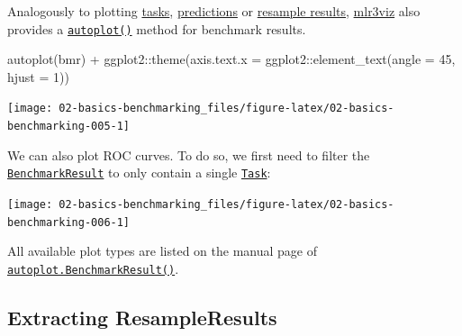 \documentclass[
]{scrbook}
\newenvironment{Shaded}{\begin{snugshade}}{\end{snugshade}}
\newcommand{\AttributeTok}[1]{\textcolor[rgb]{0.77,0.63,0.00}{#1}}
\newcommand{\DecValTok}[1]{\textcolor[rgb]{0.00,0.00,0.81}{#1}}
\newcommand{\FunctionTok}[1]{\textcolor[rgb]{0.00,0.00,0.00}{#1}}
\newcommand{\NormalTok}[1]{#1}
\newcommand{\OtherTok}[1]{\textcolor[rgb]{0.56,0.35,0.01}{#1}}
\newcommand{\SpecialCharTok}[1]{\textcolor[rgb]{0.00,0.00,0.00}{#1}}
\newcommand{\StringTok}[1]{\textcolor[rgb]{0.31,0.60,0.02}{#1}}
\renewenvironment{Shaded} {\begin{snugshade}\small} {\end{snugshade}}
\begin{document}
Analogously to plotting \protect\hyperlink{autoplot-task}{tasks}, \protect\hyperlink{autoplot-prediction}{predictions} or \protect\hyperlink{autoplot-resampleresult}{resample results}, \href{https://mlr3viz.mlr-org.com}{mlr3viz} also provides a \href{https://www.rdocumentation.org/packages/ggplot2/topics/autoplot}{\texttt{autoplot()}} method for benchmark results.

\begin{Shaded}
\begin{Highlighting}[]
\FunctionTok{autoplot}\NormalTok{(bmr) }\SpecialCharTok{+}\NormalTok{ ggplot2}\SpecialCharTok{::}\FunctionTok{theme}\NormalTok{(}\AttributeTok{axis.text.x =}\NormalTok{ ggplot2}\SpecialCharTok{::}\FunctionTok{element\_text}\NormalTok{(}\AttributeTok{angle =} \DecValTok{45}\NormalTok{, }\AttributeTok{hjust =} \DecValTok{1}\NormalTok{))}
\end{Highlighting}
\end{Shaded}

\begin{center}\texttt{[image: 02-basics-benchmarking\_files/figure-latex/02-basics-benchmarking-005-1]} \end{center}

We can also plot ROC curves.
To do so, we first need to filter the \href{https://mlr3.mlr-org.com/reference/BenchmarkResult.html}{\texttt{BenchmarkResult}} to only contain a single \href{https://mlr3.mlr-org.com/reference/Task.html}{\texttt{Task}}:

\begin{Shaded}
\end{Shaded}

\begin{center}\texttt{[image: 02-basics-benchmarking\_files/figure-latex/02-basics-benchmarking-006-1]} \end{center}

All available plot types are listed on the manual page of \href{https://mlr3viz.mlr-org.com/reference/autoplot.BenchmarkResult.html}{\texttt{autoplot.BenchmarkResult()}}.

\hypertarget{bm-resamp}{%
\subsection{Extracting ResampleResults}\label{bm-resamp}}
\end{document}
